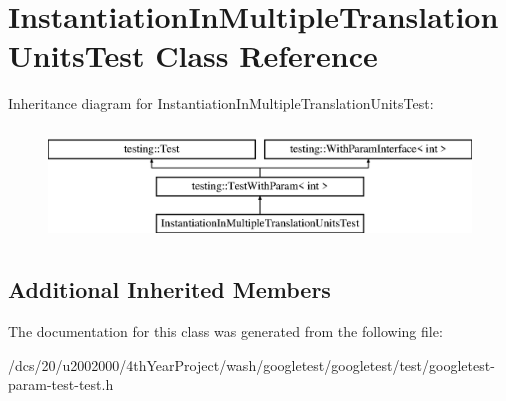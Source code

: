\hypertarget{classInstantiationInMultipleTranslationUnitsTest}{}\section{Instantiation\+In\+Multiple\+Translation\+Units\+Test Class Reference}
\label{classInstantiationInMultipleTranslationUnitsTest}
Inheritance diagram for Instantiation\+In\+Multiple\+Translation\+Units\+Test\+:\begin{figure}[H]
\begin{center}
\leavevmode
\includegraphics[height=3.000000cm]{classInstantiationInMultipleTranslationUnitsTest}
\end{center}
\end{figure}
\subsection*{Additional Inherited Members}


The documentation for this class was generated from the following file\+:\begin{DoxyCompactItemize}
\item 
/dcs/20/u2002000/4th\+Year\+Project/wash/googletest/googletest/test/googletest-\/param-\/test-\/test.\+h\end{DoxyCompactItemize}
